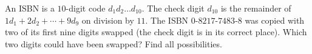 An ISBN is a $10$-digit code $d_1d_2\ldots d_{10}$. The check digit $d_{10}$ is the remainder of $1d_1+2d_2+\cdots+9d_9$ on division by $11$. The ISBN $0$-$8217$-$7483$-$8$ was copied with two of its first nine digits swapped (the check digit is in its correct place). Which two digits could have been swapped? Find all possibilities.
